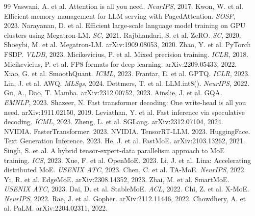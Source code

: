 \documentclass[10pt]{article}
\begin{document}
\begin{thebibliography}{99}
 Vaswani, A. et al. Attention is all you need. \emph{NeurIPS}, 2017.
 Kwon, W. et al. Efficient memory management for LLM serving with PagedAttention. \emph{SOSP}, 2023.
 Narayanan, D. et al. Efficient large-scale language model training on GPU clusters using Megatron-LM. \emph{SC}, 2021.
 Rajbhandari, S. et al. ZeRO. \emph{SC}, 2020.
 Shoeybi, M. et al. Megatron-LM. arXiv:1909.08053, 2020.
 Zhao, Y. et al. PyTorch FSDP. \emph{VLDB}, 2023.
 Micikevicius, P. et al. Mixed precision training. \emph{ICLR}, 2018.
 Micikevicius, P. et al. FP8 formats for deep learning. arXiv:2209.05433, 2022.
 Xiao, G. et al. SmoothQuant. \emph{ICML}, 2023.
 Frantar, E. et al. GPTQ. \emph{ICLR}, 2023.
 Lin, J. et al. AWQ. \emph{MLSys}, 2024.
 Dettmers, T. et al. LLM.int8(). \emph{NeurIPS}, 2022.
 Gu, A., Dao, T. Mamba. arXiv:2312.00752, 2023.
 Ainslie, J. et al. GQA. \emph{EMNLP}, 2023.
 Shazeer, N. Fast transformer decoding: One write-head is all you need. arXiv:1911.02150, 2019.
 Leviathan, Y. et al. Fast inference via speculative decoding. \emph{ICML}, 2023.
 Zheng, L. et al. SGLang. arXiv:2312.07104, 2024.
 NVIDIA. FasterTransformer. 2023.
 NVIDIA. TensorRT-LLM. 2023.
 HuggingFace. Text Generation Inference. 2023.
 He, J. et al. FastMoE. arXiv:2103.13262, 2021.
 Singh, S. et al. A hybrid tensor-expert-data parallelism approach to MoE training. \emph{ICS}, 2023.
 Xue, F. et al. OpenMoE. 2023.
 Li, J. et al. Lina: Accelerating distributed MoE. \emph{USENIX ATC}, 2023.
 Chen, C. et al. TA-MoE. \emph{NeurIPS}, 2022.
 Yi, R. et al. EdgeMoE. arXiv:2308.14352, 2023.
 Zhai, M. et al. SmartMoE. \emph{USENIX ATC}, 2023.
 Dai, D. et al. StableMoE. \emph{ACL}, 2022.
 Chi, Z. et al. X-MoE. \emph{NeurIPS}, 2022.
 Rae, J. et al. Gopher. arXiv:2112.11446, 2022.
 Chowdhery, A. et al. PaLM. arXiv:2204.02311, 2022.

\end{thebibliography}
\end{document}
